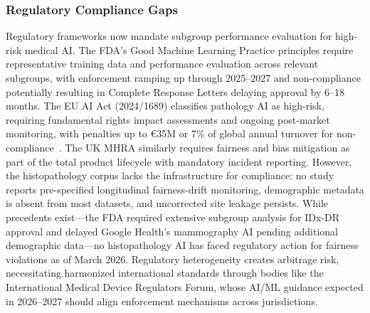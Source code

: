 \subsubsection{Regulatory Compliance Gaps}
\label{sec:discussion:regulation}
Regulatory frameworks now mandate subgroup performance evaluation for high-risk medical AI. The FDA's Good Machine Learning Practice principles require representative training data and performance evaluation across relevant subgroups, with enforcement ramping up through 2025--2027 and non-compliance potentially resulting in Complete Response Letters delaying approval by 6--18 months. The EU AI Act (2024/1689) classifies pathology AI as high-risk, requiring fundamental rights impact assessments and ongoing post-market monitoring, with penalties up to €35M or 7\% of global annual turnover for non-compliance~\citep{euaiact2024}. The UK MHRA similarly requires fairness and bias mitigation as part of the total product lifecycle with mandatory incident reporting. However, the histopathology corpus lacks the infrastructure for compliance: no study reports pre-specified longitudinal fairness-drift monitoring, demographic metadata is absent from most datasets, and uncorrected site leakage persists. While precedents exist---the FDA required extensive subgroup analysis for IDx-DR approval and delayed Google Health's mammography AI pending additional demographic data---no histopathology AI has faced regulatory action for fairness violations as of March 2026. Regulatory heterogeneity creates arbitrage risk, necessitating harmonized international standards through bodies like the International Medical Device Regulators Forum, whose AI/ML guidance expected in 2026--2027 should align enforcement mechanisms across jurisdictions.

